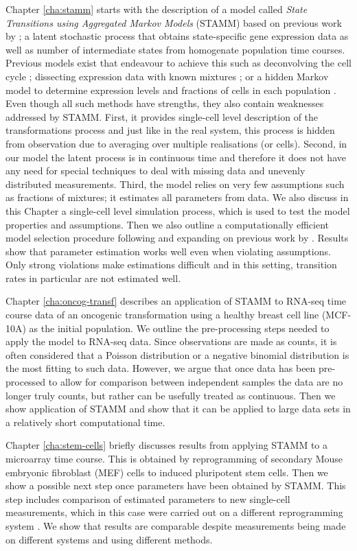 Chapter \ref{cha:stamm} starts with the description of a model called \emph{State Transitions using Aggregated Markov Models} (STAMM) based on previous work by \cite{Armond:2013}; a latent stochastic process that obtains state-specific gene expression data as well as number of intermediate states from homogenate population time courses. Previous models exist that endeavour to achieve this such as deconvolving the cell cycle \citep{Bar-Joseph04082004}; dissecting expression data with known mixtures \citep{Lahdesmaki:2005fh}; or a hidden Markov model to determine expression levels and fractions of cells in each population \citep{Roy:2006ik}. Even though all such methods have strengths, they also contain weaknesses addressed by STAMM. First, it provides single-cell level description of the transformations process and just like in the real system, this process is hidden from observation due to averaging over multiple realisations (or cells). Second, in our model the latent process is in continuous time and therefore it does not have any need for special techniques to deal with missing data and unevenly distributed measurements. Third, the model relies on very few assumptions such as fractions of mixtures; it estimates all parameters from data. We also discuss in this Chapter a single-cell level simulation process, which is used to test the model properties and assumptions. Then we also outline a computationally efficient model selection procedure following and expanding on previous work by \cite{Armond:2013}. Results show that parameter estimation works well even when violating assumptions. Only strong violations make estimations difficult and in this setting, transition rates in particular are not estimated well.

Chapter \ref{cha:oncog-transf} describes an application of STAMM to RNA-seq time course data of an oncogenic transformation using a healthy breast cell line (MCF-10A) as the initial population. We outline the pre-processing steps needed to apply the model to RNA-seq data. Since observations are made as counts, it is often considered that a Poisson distribution or a negative binomial distribution is the most fitting to such data. However, we argue that once data has been pre-processed to allow for comparison between independent samples the data are no longer truly counts, but rather can be usefully treated as continuous. Then we show application of STAMM and show that it can be applied to large data sets in a relatively short computational time.

Chapter \ref{cha:stem-cells} briefly discusses results from applying STAMM to a microarray time course. This is obtained by  reprogramming of secondary Mouse embryonic fibroblast (MEF) cells to induced pluripotent stem cells. Then we show a possible next step once parameters have been obtained by STAMM. This step includes comparison of estimated parameters to new single-cell measurements, which in this case were carried out on a different reprogramming system \citep{Buganim:2012hp}. We show that results are comparable despite measurements being made on different systems and using different methods.

